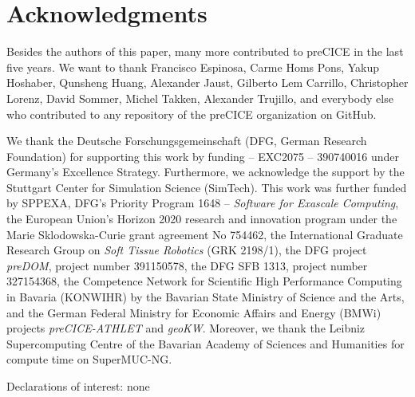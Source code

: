 \section*{Acknowledgments}



Besides the authors of this paper, many more contributed to preCICE in the last five years. We want to thank 
Francisco Espinosa,
Carme Homs Pons,
Yakup Hoshaber,
Qunsheng Huang,
Alexander Jaust,
Gilberto Lem Carrillo,
Christopher Lorenz,
David Sommer,
Michel Takken,
Alexander Trujillo,
and everybody else who contributed to any repository of the preCICE organization on GitHub.



We thank the Deutsche Forschungsgemeinschaft (DFG, German Research Foundation) for supporting this work by funding -- EXC2075 -- 390740016 under Germany's Excellence Strategy. Furthermore, we acknowledge the support by the Stuttgart Center for Simulation Science (SimTech). 
This work was further funded by SPPEXA, DFG's Priority Program 1648 -- \emph{Software for Exascale Computing},  
the European Union's Horizon 2020 research and innovation program under the Marie Sklodowska-Curie grant agreement No 754462,
the International Graduate Research Group on \emph{Soft Tissue Robotics} (GRK 2198/1),
the DFG project \emph{preDOM}, project number 391150578,
the DFG SFB 1313, project number 327154368,
the Competence Network for Scientific High Performance Computing in Bavaria (KONWIHR) by the Bavarian State Ministry of Science and the Arts,
and the German Federal Ministry for Economic Affairs and Energy (BMWi) projects \emph{preCICE-ATHLET} and \emph{geoKW}. 
Moreover, we thank the Leibniz  Supercomputing  Centre of  the  Bavarian  Academy  of Sciences and Humanities for compute time on SuperMUC-NG.

Declarations of interest: none